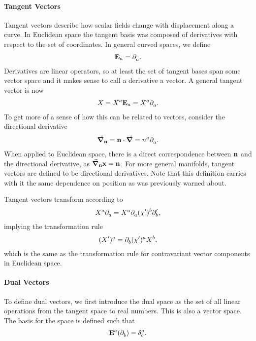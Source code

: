 \paragraph{Tangent Vectors}
Tangent vectors describe how scalar fields change with displacement along a curve. In Euclidean space the tangent basis was composed of derivatives with respect to the set of coordinates. In general curved spaces, we define
\begin{align*}
	\tb{a} = \del{a}{}.
\end{align*}
Derivatives are linear operators, so at least the set of tangent bases span some vector space and it makes sense to call a derivative a vector. A general tangent vector is now
\begin{align*}
	X = X^{a}\tb{a} = X^{a}\del{a}{}.
\end{align*}
To get more of a sense of how this can be related to vectors, consider the directional derivative
\begin{align*}
	\grad_{\vb{n}} = \vb{n}\cdot\grad = n^{a}\del{a}{}.
\end{align*}
When applied to Euclidean space, there is a direct correspondence between $\vb{n}$ and the directional derivative, as $\grad_{\vb{n}}{\vb{x}} = \vb{n}$. For more general manifolds, tangent vectors are defined to be directional derivatives. Note that this definition carries with it the same dependence on position as was previously warned about.

Tangent vectors transform according to
\begin{align*}
	X^{a}\del{a}{} = X^{a}\del{a}{(\chi^{\prime})^{b}}\del[\prime]{b}{},
\end{align*}
implying the transformation rule
\begin{align*}
	(X^{\prime})^{a} = \del{b}{(\chi^{\prime})^{a}}X^{b},
\end{align*}
which is the same as the transformation rule for contravariant vector components in Euclidean space.

\paragraph{Dual Vectors}
To define dual vectors, we first introduce the dual space as the set of all linear operations from the tangent space to real numbers. This is also a vector space. The basis for the space is defined such that
\begin{align*}
	\db{a}(\del{b}{}) = \kdelta{b}{a}.
\end{align*}

